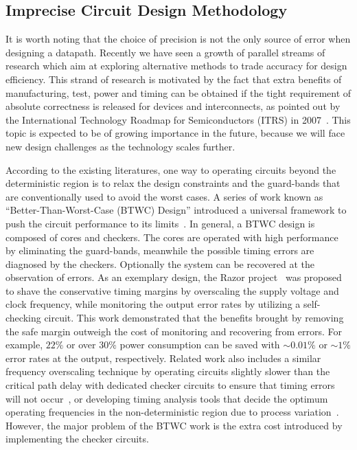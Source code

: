 \documentclass[prodmode,acmtrets]{acmsmall} %
\begin{document}
\subsection{Imprecise Circuit Design Methodology}\label{Section_Background_Imprecise}
It is worth noting that the choice of precision is not the only source of error when designing a datapath. Recently we have seen a growth of parallel streams of research which aim at exploring alternative methods to trade accuracy for design efficiency. This strand of research is motivated by the fact that extra benefits of manufacturing, test, power and timing can be obtained if the tight requirement of absolute correctness is released for devices and interconnects, as pointed out by the International Technology Roadmap for Semiconductors (ITRS) in 2007~\cite{semiconductor2007international}. This topic is expected to be of growing importance in the future, because we will face new design challenges as the technology scales further.

According to the existing literatures, one way to operating circuits beyond the deterministic region is to relax the design constraints and the guard-bands that are conventionally used to avoid the worst cases. A series of work known as ``Better-Than-Worst-Case (BTWC) Design'' introduced a universal framework to push the circuit performance to its limits~\cite{BetterThanWS2005}. In general, a BTWC design is composed of cores and checkers. The cores are operated with high performance by eliminating the guard-bands, meanwhile the possible timing errors are diagnosed by the checkers. Optionally the system can be recovered at the observation of errors. As an exemplary design, the Razor project~\cite{Razor2003,Razor2004} was proposed to shave the conservative timing margins by overscaling the supply voltage and clock frequency, while monitoring the output error rates by utilizing a self-checking circuit. This work demonstrated that the benefits brought by removing the safe margin outweigh the cost of monitoring and recovering from errors. For example, $22\%$ or over $30\%$ power consumption can be saved with $\sim0.01\%$ or $\sim1\%$ error rates at the output, respectively. Related work also includes a similar frequency overscaling technique by operating circuits slightly slower than the critical path delay with dedicated checker circuits to ensure that timing errors will not occur~\cite{TEAtime2004}, or developing timing analysis tools that decide the optimum operating frequencies in the non-deterministic region due to process variation~\cite{ProbabilisticSTA}. However, the major problem of the BTWC work is the extra cost introduced by implementing the checker circuits.
\end{document}
